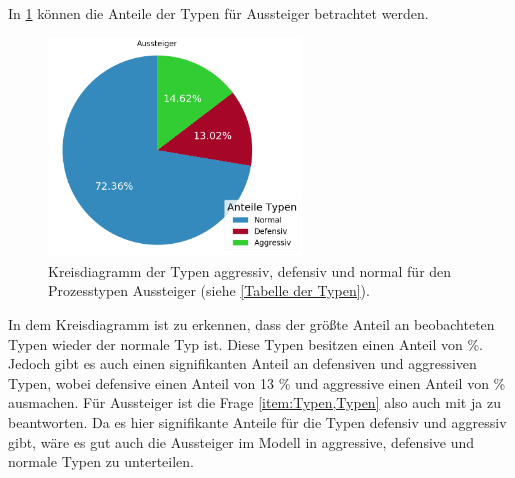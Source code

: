 In \figurename \ref{fig:AnteileTypenAussteiger} können die Anteile der Typen für Aussteiger betrachtet werden. 
\begin{figure}[H]
	\centering
		\includegraphics[width=0.6\textwidth]{pictures/data_evaluation/types/proportions_Aussteiger.png}
	\caption{Kreisdiagramm der Typen aggressiv, defensiv und normal für den Prozesstypen Aussteiger (siehe \ref{Tabelle der Typen}).}
	\label{fig:AnteileTypenAussteiger}
\end{figure}
In dem Kreisdiagramm ist zu erkennen, dass der größte Anteil an beobachteten Typen wieder der normale Typ ist. Diese Typen besitzen einen Anteil von  \%. Jedoch gibt es auch einen signifikanten Anteil an defensiven und aggressiven Typen, wobei defensive einen Anteil von 13 \% und aggressive einen Anteil von  \% ausmachen. Für Aussteiger ist die Frage \ref{item:Typen,Typen} also auch mit ja zu beantworten. Da es hier signifikante Anteile für die Typen defensiv und aggressiv gibt, wäre es gut auch die Aussteiger im Modell in aggressive, defensive und normale Typen zu unterteilen.

